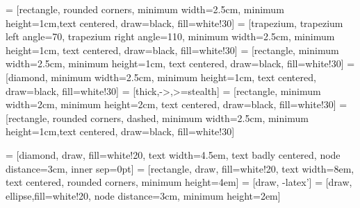 
%
%
\usepackage[T1]{fontenc}
\usepackage[utf8]{inputenc}
\usepackage[greek,english]{babel}
\usepackage[a4paper, margin=3.5cm]{geometry}
\usepackage{subfiles}
\usepackage{array}
\usepackage{tabularx}
\usepackage[colorinlistoftodos]{todonotes}
\usepackage{tikz}
\usepackage{pgfplots}
\pgfplotsset{compat=1.15}
\usepackage{longtable}
\usepackage{multirow}
\usepackage{makecell}
\usepackage{csquotes}
\usepackage{nameref}
\usepackage{caption}
\usepackage{subcaption}
\usepackage{hyperref}

\usepackage{listings}
\usepackage{pgfgantt}
\usepackage{amsmath}
\usepackage{url}
\usepackage{float} 
\usepackage[nottoc]{tocbibind} %
\usepackage{svg}
\usepackage{etoolbox}
\usepackage[square,sort,comma,numbers]{natbib}
\usepackage{graphicx}

\usepackage{pgffor}
%
%
\usepackage{tikz}

\usetikzlibrary{shapes.geometric, arrows}
 = [rectangle, rounded corners, minimum width=2.5cm, minimum height=1cm,text centered, draw=black, fill=white!30]
 = [trapezium, trapezium left angle=70, trapezium right angle=110, minimum width=2.5cm, minimum height=1cm, text centered, draw=black, fill=white!30]
 = [rectangle, minimum width=2.5cm, minimum height=1cm, text centered, draw=black, fill=white!30]
 = [diamond, minimum width=2.5cm, minimum height=1cm, text centered, draw=black, fill=white!30]
 = [thick,->,>=stealth]
 = [rectangle, minimum width=2cm, minimum height=2cm, text centered, draw=black, fill=white!30]
 = [rectangle, rounded corners, dashed, minimum width=2.5cm, minimum height=1cm,text centered, draw=black, fill=white!30]

 = [diamond, draw, fill=white!20, 
    text width=4.5em, text badly centered, node distance=3cm, inner sep=0pt]
 = [rectangle, draw, fill=white!20, 
    text width=8em, text centered, rounded corners, minimum height=4em]
 = [draw, -latex']
 = [draw, ellipse,fill=white!20, node distance=3cm,
    minimum height=2em]

%
% 
\pretocmd{\section}{\cleardoublepage}{}{}
\graphicspath{{Figures/}{/Figures/}}
\setlength{\marginparwidth}{2cm}
